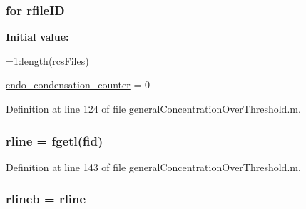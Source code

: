 \hypertarget{a00028_a2773ef160060ce8adead229154219112}{
\subsubsection[{rfile\-I\-D}]{\setlength{\rightskip}{0pt plus 5cm}for rfile\-I\-D}}\label{a00028_a2773ef160060ce8adead229154219112}
{\bfseries Initial value\-:}
\begin{DoxyCode}
=1:length(\hyperlink{a00028_aa7a414dad4901fc05688608a49adfd7e}{rcsFiles})
            
            \hyperlink{a00028_ac7610da79e174cac91899b5a15014265}{endo\_condensation\_counter} = 0
\end{DoxyCode}


Definition at line 124 of file general\-Concentration\-Over\-Threshold.\-m.

\hypertarget{a00028_a81318310a01613185f6a3e6183230bd0}{
\subsubsection[{rline}]{ rline = fgetl({\bf fid})}}\label{a00028_a81318310a01613185f6a3e6183230bd0}


Definition at line 143 of file general\-Concentration\-Over\-Threshold.\-m.

\hypertarget{a00028_a8df79027fd85d4a3668754f36e9e88c1}{
\subsubsection[{rlineb}]{\setlength{\rightskip}{0pt plus 5cm}rlineb = {\bf rline}}}\label{a00028_a8df79027fd85d4a3668754f36e9e88c1}


